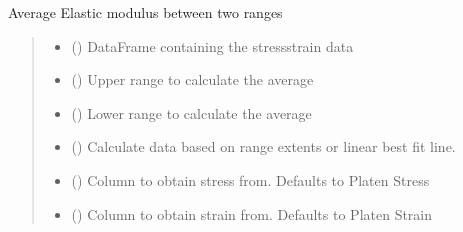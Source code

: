 \documentclass[letterpaper,10pt,english]{sphinxmanual}
\begin{document}
\begin{fulllineitems}
\begin{fulllineitems}
\label{\detokenize{pyfdempp:pyfdempp.pyfdempp.Model.Eavg_mod}}
\pysigstartsignatures
{}
\pysigstopsignatures
\sphinxAtStartPar
Average Elastic modulus between two ranges
\begin{quote}\begin{description}
\begin{itemize}
\item {} 
\sphinxAtStartPar
{} () \textendash{} DataFrame containing the stress\sphinxhyphen{}strain data

\item {} 
\sphinxAtStartPar
{} () \textendash{} Upper range to calculate the average

\item {} 
\sphinxAtStartPar
{} () \textendash{} Lower range to calculate the average

\item {} 
\sphinxAtStartPar
{} () \textendash{} Calculate data based on range extents or linear best fit line.

\item {} 
\sphinxAtStartPar
{} () \textendash{} Column to obtain stress from. Defaults to Platen Stress

\item {} 
\sphinxAtStartPar
{} () \textendash{} Column to obtain strain from. Defaults to Platen Strain


\end{itemize}
\end{description}
\end{quote}
\end{fulllineitems}
\end{fulllineitems}
\end{document}
